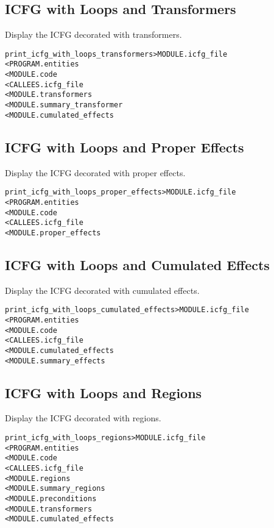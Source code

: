 \documentclass[a4paper]{report}
\newenvironment{PipsMake}{\begin{alltt}}{\end{alltt}}
\begin{document}
\subsection{ICFG with Loops and Transformers}

Display the ICFG decorated with transformers.
\begin{PipsMake}
print_icfg_with_loops_transformers       > MODULE.icfg_file
        < PROGRAM.entities
        < MODULE.code
        < CALLEES.icfg_file
        < MODULE.transformers
        < MODULE.summary_transformer
        < MODULE.cumulated_effects
\end{PipsMake}

\subsection{ICFG with Loops and Proper Effects}

Display the ICFG decorated with proper effects.
\begin{PipsMake}
print_icfg_with_loops_proper_effects     > MODULE.icfg_file
        < PROGRAM.entities
        < MODULE.code
        < CALLEES.icfg_file
        < MODULE.proper_effects
\end{PipsMake}

\subsection{ICFG with Loops and Cumulated Effects}

Display the ICFG decorated with cumulated effects.
\begin{PipsMake}
print_icfg_with_loops_cumulated_effects        > MODULE.icfg_file
        < PROGRAM.entities
        < MODULE.code
        < CALLEES.icfg_file
        < MODULE.cumulated_effects
        < MODULE.summary_effects
\end{PipsMake}

\subsection{ICFG with Loops and Regions}

Display the ICFG decorated with regions.
\begin{PipsMake}
print_icfg_with_loops_regions            > MODULE.icfg_file
        < PROGRAM.entities
        < MODULE.code
        < CALLEES.icfg_file
        < MODULE.regions
        < MODULE.summary_regions
        < MODULE.preconditions
        < MODULE.transformers
        < MODULE.cumulated_effects
\end{PipsMake}
\end{document}
